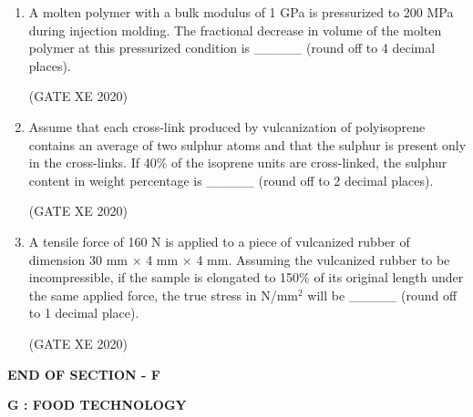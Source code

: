\documentclass[12pt]{article}
\begin{document}
\begin{enumerate}
(GATE XE 2020)

\item A molten polymer with a bulk modulus of 1 GPa is pressurized to 200 MPa during injection molding. The fractional decrease in volume of the molten polymer at this pressurized condition is \_\_\_\_\_ (round off to 4 decimal places).  

(GATE XE 2020)

\item Assume that each cross-link produced by vulcanization of polyisoprene contains an average of two sulphur atoms and that the sulphur is present only in the cross-links. If 40\% of the isoprene units are cross-linked, the sulphur content in weight percentage is \_\_\_\_\_ (round off to 2 decimal places).  

(GATE XE 2020)

\item A tensile force of 160 N is applied to a piece of vulcanized rubber of dimension 30 mm $\times$ 4 mm $\times$ 4 mm. Assuming the vulcanized rubber to be incompressible, if the sample is elongated to 150\% of its original length under the same applied force, the true stress in N/mm$^2$ will be \_\_\_\_\_ (round off to 1 decimal place).  

(GATE XE 2020)

\end{enumerate}

\begin{center}
    \textbf{END OF SECTION - F}
\end{center}

\newpage
\begin{center}
    {\Large \textbf{G : FOOD TECHNOLOGY} }
\end{center}
\end{document}
